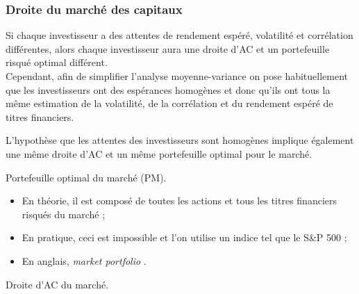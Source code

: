 \documentclass[10pt, french]{article}
\begin{document}
\begin{multicols*}{2}
\columnbreak
\subsubsection{Droite du marché des capitaux}
\begin{rappel_enhanced}[Contexte]
Si chaque investisseur a des attentes de rendement espéré, volatilité et corrélation différentes, alors chaque investisseur aura une droite d'AC et un portefeuille risqué optimal différent.\\

Cependant, afin de simplifier l'analyse moyenne-variance on pose habituellement que les investisseurs ont des espérances homogènes et donc qu'ils ont tous la même estimation de la volatilité, de la corrélation et du rendement espéré de titres financiers.
\end{rappel_enhanced}

L'hypothèse que les attentes des investisseurs sont homogènes implique également une même droite d'AC et un même portefeuille optimal pour le marché.

\begin{definitionNOHFILL}
Portefeuille optimal du marché (PM).
\begin{itemize}
	\item	En théorie, il est composé de toutes les actions et tous les titres financiers risqués du marché ;
	\item	En pratique, ceci est impossible et l'on utilise un indice tel que le S\&P 500 ;
	\item	En anglais, \og \textit{market portfolio} \fg{}.
\end{itemize}
\end{definitionNOHFILL}

\begin{definitionNOHFILL}
Droite d'AC du marché.

\begin{center}

\begin{tikzpicture}[x=0.75pt,y=0.75pt,yscale=-1,xscale=1]


\end{tikzpicture}
\end{center}
\end{definitionNOHFILL}
\end{multicols*}
\end{document}

